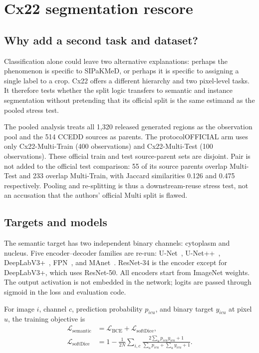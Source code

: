 \chapter{Cx22 segmentation rescore}\label{s1:ch:ch11_cx22_segmentation_rescore}

\section{Why add a second task and dataset?}

Classification alone could leave two alternative explanations: perhaps the phenomenon is specific to SIPaKMeD, or perhaps it is specific to assigning a single label to a crop. Cx22 offers a different hierarchy and two pixel-level tasks. It therefore tests whether the split logic transfers to semantic and instance segmentation without pretending that its official split is the same estimand as the pooled stress test.

The pooled analysis treats all 1,320 released generated regions as the observation pool and the 514 CCEDD sources as parents. The protocol{OFFICIAL} arm uses only Cx22-Multi-Train (400 observations) and Cx22-Multi-Test (100 observations). These official train and test source-parent sets are disjoint. Pair is not added to the official test comparison: 55 of its source parents overlap Multi-Test and 233 overlap Multi-Train, with Jaccard similarities 0.126 and 0.475 respectively. Pooling and re-splitting is thus a downstream-reuse stress test, not an accusation that the authors' official Multi split is flawed.

\section{Targets and models}

The semantic target has two independent binary channels: cytoplasm and nucleus. Five encoder--decoder families are re-run: U-Net~\cite{ronneberger2015unet}, U-Net++~\cite{zhou2020unetplusplus}, DeepLabV3+~\cite{chen2018deeplabv3plus}, FPN~\cite{lin2017fpn}, and MAnet~\cite{fan2020manet}. ResNet-34 is the encoder except for DeepLabV3+, which uses ResNet-50. All encoders start from ImageNet weights. The output activation is not embedded in the network; logits are passed through sigmoid in the loss and evaluation code.

For image $i$, channel $c$, prediction probability $p_{icu}$, and binary target $y_{icu}$ at pixel $u$, the training objective is
\begin{align}
\mathcal L_{\mathrm{semantic}}
&=\mathcal L_{\mathrm{BCE}}+\mathcal L_{\mathrm{softDice}},\\
\mathcal L_{\mathrm{softDice}}
&=1-\frac{1}{2N}\sum_{i,c}
\frac{2\sum_u p_{icu}y_{icu}+1}
{\sum_u p_{icu}+\sum_u y_{icu}+1}.
\end{align}

